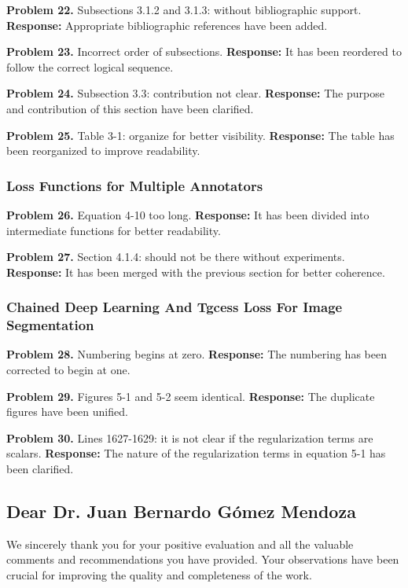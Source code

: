 \documentclass[12pt,a4paper]{article}
\begin{document}
\textbf{Problem 22.} Subsections 3.1.2 and 3.1.3: without bibliographic support.
\textbf{Response:} Appropriate bibliographic references have been added.

\textbf{Problem 23.} Incorrect order of subsections.
\textbf{Response:} It has been reordered to follow the correct logical sequence.

\textbf{Problem 24.} Subsection 3.3: contribution not clear.
\textbf{Response:} The purpose and contribution of
this section have been clarified.

\textbf{Problem 25.} Table 3-1: organize for better visibility.
\textbf{Response:} The table has been reorganized to improve readability.

\subsubsection*{Loss Functions for Multiple Annotators}

\textbf{Problem 26.} Equation 4-10 too long.
\textbf{Response:} It has been divided into intermediate functions for
better readability.

\textbf{Problem 27.} Section 4.1.4: should not be there without experiments.
\textbf{Response:} It has been merged with the previous section for
better coherence.

\subsubsection*{Chained Deep Learning And Tgcess Loss For Image Segmentation}

\textbf{Problem 28.} Numbering begins at zero.
\textbf{Response:} The numbering has been corrected to begin at one.

\textbf{Problem 29.} Figures 5-1 and 5-2 seem identical.
\textbf{Response:} The duplicate figures have been unified.

\textbf{Problem 30.} Lines 1627-1629: it is not clear if the
regularization terms are scalars.
\textbf{Response:} The nature of the regularization terms
in equation 5-1 has been clarified.

\subsection*{Dear Dr. Juan Bernardo Gómez Mendoza}

We sincerely thank you for your positive evaluation and all the valuable
comments and recommendations you have provided. Your observations
have been crucial for improving the quality and completeness of the work.
\end{document}
